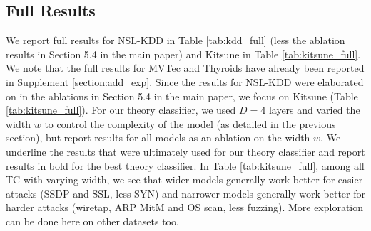 \documentclass{article}
\begin{document}
\subsection{Full Results}

We report full results for NSL-KDD in Table \ref{tab:kdd_full} (less the ablation results in Section 5.4 in the main paper) and Kitsune in Table \ref{tab:kitsune_full}.
We note that the full results for MVTec and Thyroids have already been reported in Supplement \ref{section:add_exp}.
Since the results for NSL-KDD were elaborated on in the ablations in Section 5.4 in the main paper,
we focus on Kitsune (Table \ref{tab:kitsune_full}).
For our theory classifier, we used $D=4$ layers and varied the width $w$ to control the complexity of the model (as detailed in the previous section), but report results for all models as an ablation on the width $w$.
We underline the results that were ultimately used for our theory classifier and report results in bold for the best theory classifier.
In Table \ref{tab:kitsune_full}, among all TC with varying width, we see that wider models generally work better for easier attacks (SSDP and SSL, less SYN) and narrower models generally work better for harder attacks (wiretap, ARP MitM and OS scan, less fuzzing).
More exploration can be done here on other datasets too.
\end{document}

